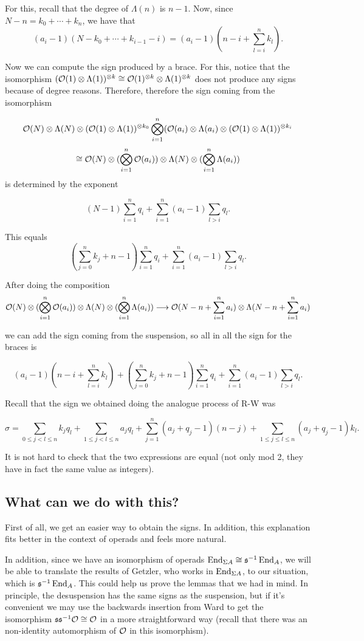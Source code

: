 \documentclass[twoside]{article}
\begin{document}
For this, recall that the degree of $\Lambda(n)$ is $n-1$. Now, since $N-n=k_0+\cdots+k_n$, we have that
$$(a_i-1)(N-k_0+\cdots+k_{i-1}-i)=(a_i-1)(n-i+\sum_{l=i}^nk_l).$$

Now we can compute the sign produced by a brace. For this, notice that the isomorphism $({\mathcal O}(1)\otimes \Lambda(1))^{\otimes k}\cong {\mathcal O}(1)^{\otimes k}\otimes \Lambda(1)^{\otimes k}$ does not produce any signs because of degree reasons. Therefore, therefore the sign coming from the isomorphism

$${\mathcal O}(N)\otimes\Lambda(N)\otimes ({\mathcal O}(1)\otimes \Lambda(1))^{\otimes k_0}\bigotimes_{i=1}^n({\mathcal O}(a_i)\otimes\Lambda(a_i)\otimes({\mathcal O}(1)\otimes\Lambda(1))^{\otimes k_i}$$
$$\cong {\mathcal O}(N)\otimes(\bigotimes_{i=1}^n {\mathcal O}(a_i))\otimes \Lambda(N)\otimes(\bigotimes_{i=1}^n \Lambda(a_i))$$
is determined by the exponent

$$(N-1)\sum_{i=1}^nq_i+\sum_{i=1}^n (a_i-1)\sum_{l>i}q_l.$$

This equals
$$(\sum_{j=0}^nk_j +n-1)\sum_{i=1}^nq_i+\sum_{i=1}^n (a_i-1)\sum_{l>i}q_l.$$

After doing the composition 
$${\mathcal O}(N)\otimes(\bigotimes_{i=1}^n {\mathcal O}(a_i))\otimes \Lambda(N)\otimes(\bigotimes_{i=1}^n \Lambda(a_i))\longrightarrow {\mathcal O}(N-n+\sum_{i=1}^na_i)\otimes \Lambda(N-n+\sum_{i=1}^na_i)$$

we can add the sign coming from the suspension, so all in all the sign for the braces is

$$(a_i-1)(n-i+\sum_{l=i}^nk_l)+(\sum_{j=0}^nk_j +n-1)\sum_{i=1}^nq_i+\sum_{i=1}^n (a_i-1)\sum_{l>i}q_l.$$

Recall that the sign we obtained doing the analogue process of R-W was 

$$\sigma=\sum_{0\leq j<l\leq n}k_jq_l+\sum_{1\leq j<l\leq n}a_jq_l+\sum_{j=1}^n (a_j+q_j-1)(n-j)+\sum_{1\leq j\leq l\leq n} (a_j+q_j-1)k_l.$$

It is not hard to check that the two expressions are equal (not only mod 2, they have in fact the same value as integers).


\subsection{What can we do with this?}
First of all, we get an easier way to obtain the signs. In addition, this explanation fits better in the context of operads and feels more natural.

In addition, since we have an isomorphism of operads $\operatorname{End}_{\Sigma A}\cong \mathfrak{s}^{-1}\operatorname{End}_A$, we will be able to translate the results of Getzler, who works in $\operatorname{End}_{\Sigma A}$, to our situation, which is $\mathfrak{s}^{-1}\operatorname{End}_A$. This could help us prove the lemmas that we had in mind. In principle, the desuspension has the same signs as the suspension, but if it's convenient we may use the backwards insertion from Ward to get the isomorphism $\mathfrak{s}\mathfrak{s}^{-1}{\mathcal O}\cong{\mathcal O}$ in a more straightforward way (recall that there was an non-identity automorphism of ${\mathcal O}$ in this isomorphism).
\end{document}
